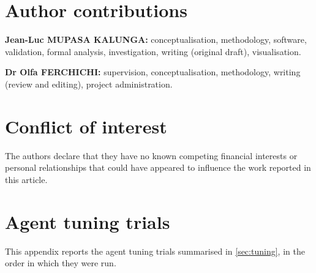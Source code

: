 \documentclass[11pt,a4paper]{article}
\newif\ifrevmarks
\newif\ifcorrmarks
\newcommand{\corr}[1]{\ifcorrmarks\textcolor{corrcolor}{#1}\else#1\fi}
\newcommand{\adir}[1]{\ifrevmarks\textcolor{violet}{\textbf{[TO VALIDATE WITH THE SUPERVISOR: #1]}}\fi}
\begin{document}
\section*{Author contributions}

\textbf{Jean-Luc MUPASA KALUNGA:} conceptualisation, methodology, software, validation, formal analysis, investigation, writing (original draft), visualisation.

\textbf{Dr Olfa FERCHICHI:} supervision, conceptualisation, methodology, writing (review and editing), project administration.

\section*{Conflict of interest}

The authors declare that they have no known competing financial interests or personal relationships that could have appeared to influence the work reported in this article.




\adir{bibliography style: use the template of the target journal.}

\appendix
\section{Agent tuning trials}
\label{app:tuning}

\corr{This appendix reports the agent tuning trials summarised in \cref{sec:tuning}, in the order in which they were run.}
\end{document}
